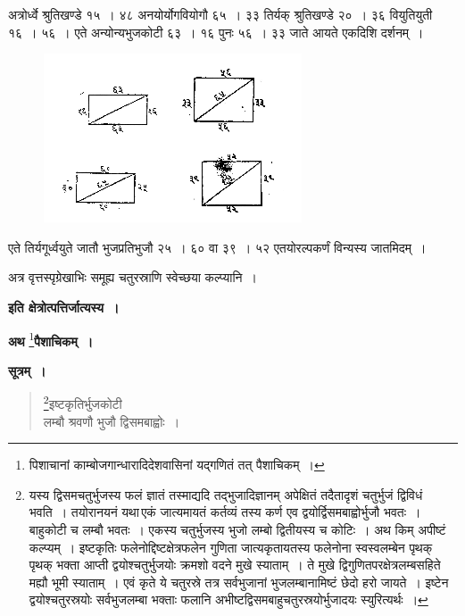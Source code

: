 \documentclass[11pt, openany]{book}
\begin{document}
 अत्रोर्ध्वे श्रुतिखण्डे १५~। ४८ अनयोर्योगवियोगौ ६५~। ३३ तिर्यक्
श्रुतिखण्डे २०~। ३६ वियुतियुती १६~। ५६~। एते अन्योन्यभुजकोटी
६३~। १६ पुनः ५६~। ३३ जाते आयते एकदिशि दर्शनम्~। 
\vspace{-2mm}

\begin{figure}[h!]
    \centering
    \includegraphics[scale=0.85]{graphics/capture123.png}
\end{figure}
\newpage%
\setcounter{footnote}{0}

 एते तिर्यगूर्ध्वयुते जातौ भुजप्रतिभुजौ २५~। ६० वा ३९~। ५२
एतयोरल्पकर्णं विन्यस्य जातमिदम्~। \\
\vspace{-4mm}

अत्र वृत्तस्पृग्रेखाभिः समूह्य चतुरस्राणि स्वेच्छया कल्प्यानि~। 

\begin{center}
    \textbf{इति क्षेत्रोत्पत्तिर्जात्यस्य~।} \\
\vspace{4mm}

{\large \textbf{अथ} \footnote{पिशाचानां काम्बोजगान्धारादिदेशवासिनां यद्गणितं
तत् पैशाचिकम्~।}\textbf{पैशाचिकम्~।}}
\end{center}

\textbf{सूत्रम्~।}

\begin{quote}
   \bs
  \footnote{यस्य द्विसमचतुर्भुजस्य फलं ज्ञातं तस्माद्यदि तद्भुजादिज्ञानम् अपेक्षितं तदैतादृशं चतुर्भुजं द्विविधं भवति~। तयोरानयनं यथा\textendash \,एकं जात्यमायतं कर्तव्यं तस्य कर्ण एव द्वयोर्द्विसमबाह्वोर्भुजौ
भवतः~। बाहुकोटी च लम्बौ भवतः~। एकस्य चतुर्भुजस्य भुजो
लम्बो द्वितीयस्य च कोटिः~। अथ किम् अपीष्टं कल्प्यम्~। इष्टकृतिः
फलेनोद्दिष्टक्षेत्रफलेन गुणिता जात्यकृतायतस्य फलेनोना स्वस्वलम्बेन पृथक् पृथक् भक्ता आप्ती द्वयोश्चतुर्भुजयोः क्रमशो वदने मुखे स्याताम्~। ते मुखे द्विगुणितपरक्षेत्रलम्बसहिते मह्यौ भूमी स्याताम्~। एवं कृते ये चतुरस्रे तत्र सर्वभुजानां भुजलम्बानामिष्टं
छेदो हरो जायते~। इष्टेन द्वयोश्चतुरस्रयोः सर्वभुजलम्बा भक्ताः
फलानि अभीष्टद्विसमबाहुचतुरस्रयोर्भुजादयः स्युरित्यर्थः~।}इष्टकृतिर्भुजकोटी\\
लम्बौ श्रवणौ भुजौ द्विसमबाह्वोः~। 
\end{quote}
\end{document}
